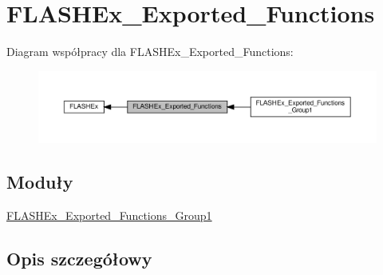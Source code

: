 \hypertarget{group___f_l_a_s_h_ex___exported___functions}{}\section{F\+L\+A\+S\+H\+Ex\+\_\+\+Exported\+\_\+\+Functions}
\label{group___f_l_a_s_h_ex___exported___functions}
Diagram współpracy dla F\+L\+A\+S\+H\+Ex\+\_\+\+Exported\+\_\+\+Functions\+:\nopagebreak
\begin{figure}[H]
\begin{center}
\leavevmode
\includegraphics[width=350pt]{group___f_l_a_s_h_ex___exported___functions}
\end{center}
\end{figure}
\subsection*{Moduły}
\begin{DoxyCompactItemize}
\item 
\hyperlink{group___f_l_a_s_h_ex___exported___functions___group1}{F\+L\+A\+S\+H\+Ex\+\_\+\+Exported\+\_\+\+Functions\+\_\+\+Group1}
\end{DoxyCompactItemize}


\subsection{Opis szczegółowy}
